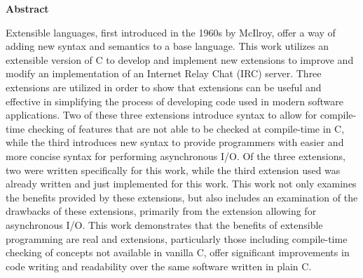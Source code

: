 \documentclass[main.tex]{subfiles}
\begin{document}
\begin{center}\textbf{Abstract}\end{center}
Extensible languages, first introduced in the 1960s by McIlroy, offer a way of adding new syntax and semantics to a
base language. This work utilizes an extensible version of C to develop and implement new extensions to improve
and modify an implementation of an Internet Relay Chat (IRC) server. Three extensions are utilized in order to
show that extensions can be useful and effective in simplifying the process of developing code used in modern
software applications. Two of these three extensions introduce syntax to allow for compile-time checking of features
that are not able to be checked at compile-time in C, while the third introduces new syntax to provide programmers
with easier and more concise syntax for performing asynchronous I/O. Of the three extensions, two were written 
specifically for this work, while the third extension used was already written and just implemented for this work. This
work not only examines the benefits provided by these extensions, but also includes an examination of the drawbacks
of these extensions, primarily from the extension allowing for asynchronous I/O. This work demonstrates that the
benefits of extensible programming are real and extensions, particularly those including compile-time checking of
concepts not available in vanilla C, offer significant improvements in code writing and readability over the same
software written in plain C.
\end{document}
